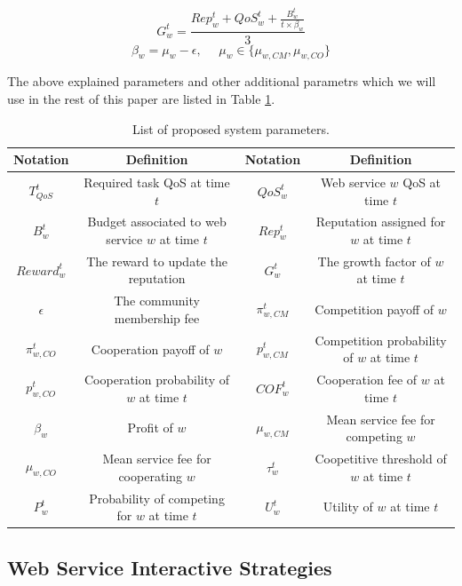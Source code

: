 \documentclass[runningheads,a4paper]{llncs}
\begin{document}
\begin{equation}\label{eq:growthfactor}
G^t_w = \frac{Rep^t_w + QoS_w^t+\frac{B_w^t}{t\times \beta_w}}{3}
\end{equation}
\begin{equation*}
\beta_w=\mu_{w}-\epsilon, ~~~~~~\mu_{w} \in\{\mu_{w, CM}, \mu_{w,
CO}\}
\end{equation*}

The above explained parameters and other additional parametrs
which we will use in the rest of this paper are listed in Table
\ref{Preliminaries}.


\begin{table}
\centering
\caption{List of proposed system parameters.}
\begin{tabular}{|c|c||c|c|}
\hline
\textbf{Notation} & \textbf{Definition} & \textbf{Notation} & \textbf{Definition}\\
\hline\hline
$T_{QoS}^t$ & Required task QoS at time $t$ & $QoS_w^t$ & Web service $w$ QoS at time $t$ \\
$B_w^t$ & Budget associated to web service $w$ at time $t$ & $Rep^t_w$ & Reputation assigned for $w$ at time $t$\\
$Reward_w^t$ & The reward to update the reputation & $G^t_w$ & The growth factor of $w$ at time $t$\\
$\epsilon$ & The community membership fee & $\pi_{w,CM}^t$ & Competition payoff of $w$ \\
$\pi_{w,CO}^t$ & Cooperation payoff of $w$ & $p_{w,CM}^t$ & Competition probability of $w$ at time $t$\\
$p_{w,CO}^t$ & Cooperation probability of $w$ at time $t$& $COF_w^t$ & Cooperation fee of $w$ at time $t$\\
$\beta_w$ & Profit of $w$& $\mu_{w, CM}$ & Mean service fee for competing $w$ \\
$\mu_{w, CO}$ & Mean service fee for cooperating $w$ & $\tau_w^t$ & Coopetitive threshold of $w$ at time $t$ \\
$P_w^t$ & Probability of competing for $w$ at time $t$& $U_w^t$ & Utility of $w$ at time $t$\\
\hline
\end{tabular}
\label{Preliminaries}
\end{table}

\subsection{Web Service Interactive Strategies}
\end{document}
